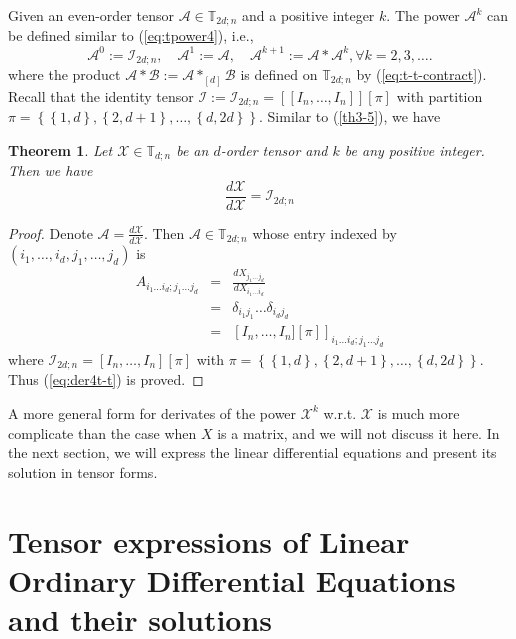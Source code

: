 \documentclass[11pt, oneside]{article}  %
\newtheorem{thm}{Theorem}[section]
\newcommand{\dsb}[1]{[\![#1]\!]}
\newcommand{\set}[1]{\left\{#1\right\}}
\newcommand{\TT}{\mathbb{T}}
\newcommand{\A}{\mathcal{A}}
\newcommand{\B}{\mathcal{B}}
\newcommand{\caI}{\mathcal{I}}
\newcommand{\X}{\mathcal{X}}
\newcommand{\beq}{\begin{equation}}
\newcommand{\eeq}{\end{equation}}
\newcommand{\beyy}{\begin{eqnarray*}}
\newcommand{\eeyy}{\end{eqnarray*}}
\begin{document}
Given an even-order tensor $\A\in\TT_{2d;n}$ and a positive integer $k$. The power $\A^{k}$ can be defined similar to (\ref{eq:tpower4}), i.e.,  
\beq\label{eq:Tpower-general} 
\A^{0}:=\caI_{2d;n}, \quad \A^{1}:=\A, \quad \A^{k+1}:=\A\ast\A^{k}, \forall k=2,3,\ldots . 
\eeq
where the product $\A\ast\B:= \A\ast_{[d]} \B$ is defined on $\TT_{2d;n}$ by (\ref{eq:t-t-contract}).  Recall that the identity tensor 
$\caI:=\caI_{2d;n}=\dsb{I_{n},\ldots,I_{n}}[\pi]$ with partition $\pi=\set{\set{1,d},\set{2,d+1},\ldots, \set{d,2d}}$. Similar to (\ref{th3-5}), 
we have
\begin{thm}\label{th3-6} 
Let $\X\in\TT_{d;n}$ be an $d$-order tensor and $k$ be any positive integer.  Then we have 
\beq\label{eq:der4t-t}
\frac{d\X}{d\X} = \caI_{2d;n}
\eeq
\end{thm}
\begin{proof}
Denote $\A=\frac{d\X}{d\X}$. Then $\A\in\TT_{2d;n}$ whose entry indexed by $(i_{1},\ldots, i_{d}, j_{1},\ldots,j_{d})$ is 
\beyy 
A_{i_{1}\ldots i_{d};j_{1}\ldots j_{d}} 
&=& \frac{dX_{j_{1}\ldots j_{d}}}{dX_{i_{1}\ldots i_{d}}} \\
&=& \delta_{i_{1}j_{1}}\ldots \delta_{i_{d}j_{d}} \\ 
&=& \left[ I_{n},\ldots, I_{n}][\pi]\right]_{i_{1}\ldots i_{d};j_{1}\ldots j_{d}} 
\eeyy
where $\caI_{2d;n}= [I_{n},\ldots, I_{n}][\pi]$ with $\pi=\set{\set{1,d},\set{2,d+1},\ldots, \set{d, 2d}}$.  Thus (\ref{eq:der4t-t}) is proved. 
\end{proof}

A more general form for derivates of the power $\X^{k}$ w.r.t. $\X$ is much more complicate than the case when $X$ is a matrix, and we 
will not discuss it here.  In the next section, we will express the linear differential equations and present its solution in tensor forms. 

\vskip 5pt
\section{Tensor expressions of Linear Ordinary Differential Equations and their solutions}
\label{sec4} 
\setcounter{equation}{0} 
\end{document}
